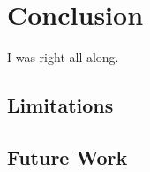 \chapter{Conclusion}
\label{chap:conc}

I was right all along.

\section{Limitations}



\section{Future Work}
